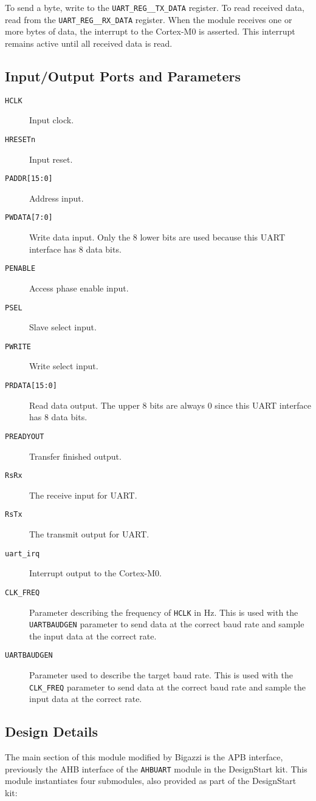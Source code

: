 To send a byte, write to the \texttt{UART\_REG\_\_TX\_DATA} register. To read received data, read from the \texttt{UART\_REG\_\_RX\_DATA} register. When the module receives one or more bytes of data, the interrupt to the Cortex-M0 is asserted. This interrupt remains active until all received data is read.

\subsection{Input/Output Ports and Parameters}
\begin{description}
	\item[\texttt{HCLK}] Input clock.
	\item[\texttt{HRESETn}] Input reset.
	\item[\texttt{PADDR[15:0]}] Address input.
	\item[\texttt{PWDATA[7:0]}] Write data input. Only the 8 lower bits are used because this UART interface has 8 data bits.
	\item[\texttt{PENABLE}] Access phase enable input.
	\item[\texttt{PSEL}] Slave select input.
	\item[\texttt{PWRITE}] Write select input.
	\item[\texttt{PRDATA[15:0]}] Read data output. The upper 8 bits are always 0 since this UART interface has 8 data bits.
	\item[\texttt{PREADYOUT}] Transfer finished output.
	\item[\texttt{RsRx}] The receive input for UART.
	\item[\texttt{RsTx}] The transmit output for UART.
	\item[\texttt{uart\_irq}] Interrupt output to the Cortex-M0.
	\item[\texttt{CLK\_FREQ}] Parameter describing the frequency of \texttt{HCLK} in Hz. This is used with the  \texttt{UARTBAUDGEN} parameter to send data at the correct baud rate and sample the input data at the correct rate.
	\item[\texttt{UARTBAUDGEN}] Parameter used to describe the target baud rate. This is used with the  \texttt{CLK\_FREQ} parameter to send data at the correct baud rate and sample the input data at the correct rate.
\end{description}

\subsection{Design Details}
The main section of this module modified by Bigazzi is the APB interface, previously the AHB interface of the \texttt{AHBUART} module in the DesignStart kit. This module instantiates four submodules, also provided as part of the DesignStart kit:

